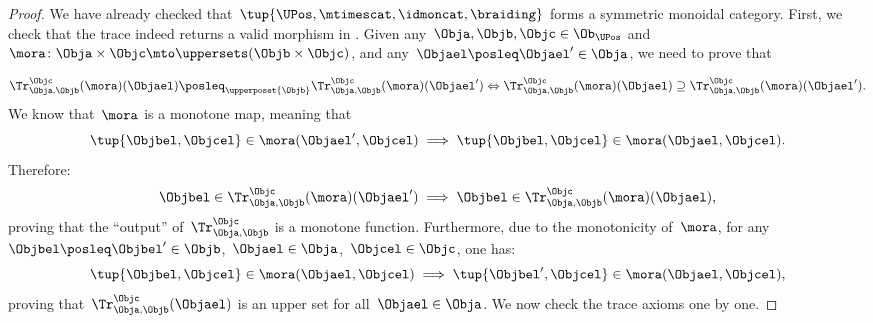 \begin{proof}
    We have already checked that~$\tup{\UPos,\mtimescat, \idmoncat,\braiding}$ forms a symmetric monoidal category.
    First, we check that the trace indeed returns a valid morphism in \UPos.
    Given any~$\Obja,\Objb,\Objc\in \Ob_{\UPos}$ and~$\mora\colon \Obja\times \Objc \mto \uppersets(\Objb\times \Objc)$,
    and any~$\Objael\posleq \Objael'\in \Obja$, we need to prove that

    \begin{equation*}
        \Tr_{\Obja,\Objb}^{\Objc}(\mora)(\Objael) \posleq_{\upperposet{\Objb}}  \Tr_{\Obja,\Objb}^{\Objc}(\mora)(\Objael') \Leftrightarrow \Tr_{\Obja,\Objb}^{\Objc}(\mora)(\Objael) \supseteq \Tr_{\Obja,\Objb}^{\Objc}(\mora)(\Objael').
    \end{equation*}
    We know that~$\mora$ is a monotone map, meaning that
    \begin{equation*}
        \tup{\Objbel,\Objcel} \in \mora(\Objael',\Objcel) \implies \tup{\Objbel,\Objcel}\in \mora(\Objael,\Objcel).
    \end{equation*}
    Therefore:
    \begin{equation*}
        \Objbel \in \Tr_{\Obja,\Objb}^{\Objc}(\mora)(\Objael') \implies \Objbel \in \Tr_{\Obja,\Objb}^{\Objc}(\mora)(\Objael),
    \end{equation*}
    proving that the ``output'' of~$\Tr_{\Obja,\Objb}^{\Objc}$ is a monotone function.
    Furthermore, due to the monotonicity of~$\mora$, for any~$\Objbel\posleq \Objbel'\in \Objb$,~$\Objael\in \Obja$,~$\Objcel \in \Objc$, one has:
    \begin{equation*}
        \tup{\Objbel,\Objcel}\in \mora(\Objael,\Objcel)\implies \tup{\Objbel',\Objcel}\in \mora(\Objael,\Objcel),
    \end{equation*}
    proving that~$\Tr_{\Obja,\Objb}^{\Objc}(\Objael)$ is an upper set for all~$\Objael\in \Obja$.
    We now check the trace axioms one by one.


\end{proof}
